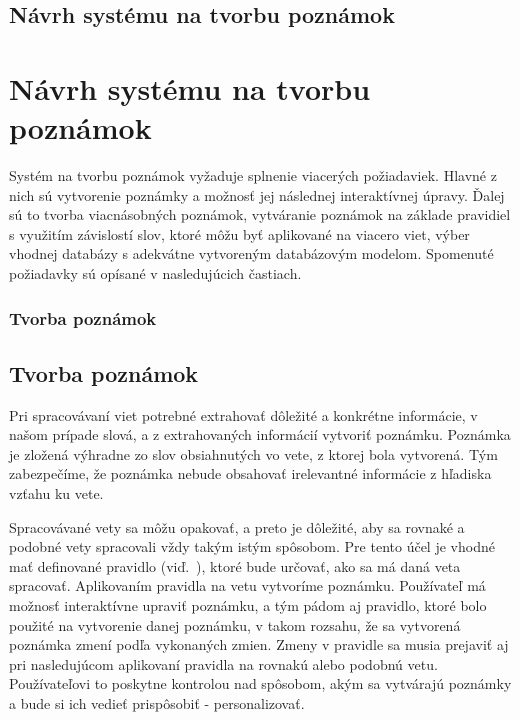 \newpage
%
%
{
	\section{Návrh systému na tvorbu poznámok}
}
{
	\chapter{Návrh systému na tvorbu poznámok}
}
\label{design}
Systém na tvorbu poznámok vyžaduje splnenie viacerých požiadaviek. Hlavné z nich sú vytvorenie poznámky a možnosť jej následnej interaktívnej úpravy. Ďalej sú to tvorba viacnásobných poznámok, vytváranie poznámok na základe pravidiel s využitím závislostí slov, ktoré môžu byť aplikované na viacero viet, výber vhodnej databázy s adekvátne vytvoreným databázovým modelom. Spomenuté požiadavky sú opísané v nasledujúcich častiach.

%
%
{
	\subsection{Tvorba poznámok}
}
{
	\section{Tvorba poznámok}
}
\label{subsection:notes_creation}
Pri spracovávaní viet potrebné extrahovať dôležité a konkrétne informácie, v našom prípade slová, a z extrahovaných informácií vytvoriť poznámku. Poznámka je zložená výhradne zo slov obsiahnutých vo vete, z ktorej bola vytvorená. Tým zabezpečíme, že poznámka nebude obsahovať irelevantné informácie z hľadiska vzťahu ku vete. 

Spracovávané vety sa môžu opakovať, a preto je dôležité, aby sa rovnaké a podobné vety spracovali vždy takým istým spôsobom. Pre tento účel je vhodné mať definované pravidlo (viď.~), ktoré bude určovať, ako sa má daná veta spracovať. Aplikovaním pravidla na vetu vytvoríme poznámku. Používateľ má možnosť interaktívne upraviť poznámku, a tým pádom aj pravidlo, ktoré bolo použité na vytvorenie danej poznámku, v takom rozsahu, že sa vytvorená poznámka zmení podľa vykonaných zmien. Zmeny v pravidle sa musia prejaviť aj pri nasledujúcom aplikovaní pravidla na rovnakú alebo podobnú vetu. Používateľovi to poskytne kontrolou nad spôsobom, akým sa vytvárajú poznámky a bude si ich vedieť prispôsobiť - personalizovať.

